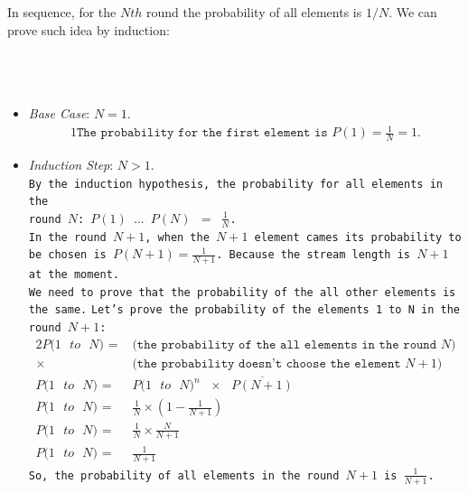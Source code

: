 In sequence, for the $Nth$ round the probability of all elements is $1/N$. We
can prove such idea by induction:
\\
\\
\\
\\
\begin{itemize}
	\item \emph{Base Case}: $N = 1$.
		\begin{alignat*}{1}
			\texttt{The probability for the first element is $P(1) = \frac{1}{N} = 1$.}
		\end{alignat*}

	\item \emph{Induction Step}: $N > 1$.\\
		\texttt{By the induction hypothesis, the probability for all elements in the\\
				round $N$: $P(1)$ $...$ $P(N)$ $=$ $\frac{1}{N}$.}\\
		\texttt{In the round $N+1$, when the $N+1$ element cames its probability to be chosen is
				$P(N+1) = \frac{1}{N+1}$. Because the stream length is $N+1$ at the moment.}\\
		\texttt{We need to prove that the probability of the all other elements is the same.}
		\texttt{Let's prove the probability of the elements 1 to N in the round $N+1$:}
		\begin{alignat*}{2}
			\texttt{$P($$1$ $to$ $N)$ = }& \texttt{(the probability of the all elements in the round $N$)}\\
			\texttt{$\times$} 		 & \texttt{(the probability doesn't choose the element $N+1$)} \\
			\texttt{$P($$1$ $to$ $N)$ = }& \texttt{$P(1$ $to$ $N)^{n}$ $\times$ $\overline{P(N+1)}$}\\
			\texttt{$P($$1$ $to$ $N)$ = }& \texttt{$\frac{1}{N}  \times \left(1 - \frac{1}{N+1}\right)$} \\
			\texttt{$P($$1$ $to$ $N)$ = }& \texttt{$\frac{1}{N}  \times \frac{N}{N+1}$}\\
			\texttt{$P($$1$ $to$ $N)$ = }& \texttt{$\frac{1}{N+1}$}
		\end{alignat*}
		\texttt{So, the probability of all elements in the round $N+1$ is $\frac{1}{N+1}$.}\\
		\begin{comment}		
		\begin{flalign*}
			&|\vec a| = \sqrt{3^{2}+1^{2}} = \sqrt{10} & \\
			&|\vec b| = \sqrt{1^{2}+23^{2}} = \sqrt{530} &\\ 
			&\cos v = \frac{26}{\sqrt{10} \cdot \sqrt{530}} &\\
			&v = \cos^{-1} \left(\frac{26}{\sqrt{10} \cdot \sqrt{530}}\right) &\\
		\end{flalign*}
		\end{comment}
\end{itemize}



